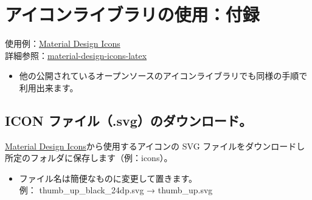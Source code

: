\documentclass[a5j,10pt]{ltjarticle}
\newcommand{\bsgithub}{}
\begin{document}
\section{アイコンライブラリの使用：付録}
使用例：\href{https://fonts.google.com/icons}{Material Design Icons}\\
\hspace{4mm}詳細参照：\href{https://github.com/ru-museum/material-design-icons-latex}{material-design-icons-latex} \bsgithub

\begin{itemize}
  \item 他の公開されているオープンソースのアイコンライブラリでも同様の手順で利用出来ます。
\end{itemize}

\subsection{ICON ファイル（.svg）のダウンロード。}
\href{https://fonts.google.com/icons}{Material Design Icons}から使用するアイコンの SVG ファイルをダウンロードし所定のフォルダに保存します（例：icons）。

\begin{itemize}
  \item ファイル名は簡便なものに変更して置きます。\\
\hspace{4mm}例： thumb\_up\_black\_24dp.svg → thumb\_up.svg　
\end{itemize}

\newpage
\end{document}
